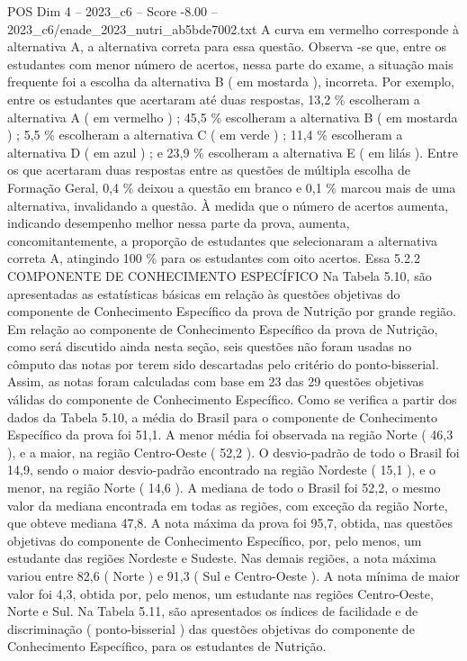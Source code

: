 \begin{textsample}{POS Dim 4 – 2023\_c6 – Score -8.00 – 2023\_c6/enade\_2023\_nutri\_ab5bde7002.txt}
A curva em vermelho corresponde à alternativa A, a alternativa correta para essa questão.
Observa -se que, entre os estudantes com menor número de acertos, nessa parte do exame, a situação mais frequente foi a escolha da alternativa B ( em mostarda ), incorreta.
Por exemplo, entre os estudantes que acertaram até duas respostas, 13,2 \% escolheram a alternativa A ( em vermelho ) ; 45,5 \% escolheram a alternativa B ( em mostarda ) ; 5,5 \% escolheram a alternativa C ( em verde ) ; 11,4 \% escolheram a alternativa D ( em azul ) ; e 23,9 \% escolheram a alternativa E ( em lilás ).
Entre os que acertaram duas respostas entre as questões de múltipla escolha de Formação Geral, 0,4 \% deixou a questão em branco e 0,1 \% marcou mais de uma alternativa, invalidando a questão.
À medida que o número de acertos aumenta, indicando desempenho melhor nessa parte da prova, aumenta, concomitantemente, a proporção de estudantes que selecionaram a alternativa correta A, atingindo 100 \% para os estudantes com oito acertos.
Essa 5.2.2 COMPONENTE DE CONHECIMENTO ESPECÍFICO Na Tabela 5.10, são apresentadas as estatísticas básicas em relação às questões objetivas do componente de Conhecimento Específico da prova de Nutrição por grande região.
Em relação ao componente de Conhecimento Específico da prova de Nutrição, como será discutido ainda nesta seção, seis questões não foram usadas no cômputo das notas por terem sido descartadas pelo critério do ponto-bisserial.
Assim, as notas foram calculadas com base em 23 das 29 questões objetivas válidas do componente de Conhecimento Específico.
Como se verifica a partir dos dados da Tabela 5.10, a média do Brasil para o componente de Conhecimento Específico da prova foi 51,1.
A menor média foi observada na região Norte ( 46,3 ), e a maior, na região Centro-Oeste ( 52,2 ).
O desvio-padrão de todo o Brasil foi 14,9, sendo o maior desvio-padrão encontrado na região Nordeste ( 15,1 ), e o menor, na região Norte ( 14,6 ).
A mediana de todo o Brasil foi 52,2, o mesmo valor da mediana encontrada em todas as regiões, com exceção da região Norte, que obteve mediana 47,8.
A nota máxima da prova foi 95,7, obtida, nas questões objetivas do componente de Conhecimento Específico, por, pelo menos, um estudante das regiões Nordeste e Sudeste.
Nas demais regiões, a nota máxima variou entre 82,6 ( Norte ) e 91,3 ( Sul e Centro-Oeste ).
A nota mínima de maior valor foi 4,3, obtida por, pelo menos, um estudante nas regiões Centro-Oeste, Norte e Sul.
Na Tabela 5.11, são apresentados os índices de facilidade e de discriminação ( ponto-bisserial ) das questões objetivas do componente de Conhecimento Específico, para os estudantes de Nutrição.

\end{textsample}
